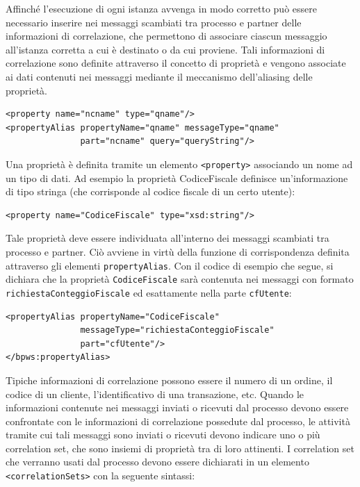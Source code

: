 Affinché l'esecuzione di ogni istanza avvenga in modo corretto può essere 
necessario inserire nei messaggi scambiati tra processo e partner delle
informazioni di correlazione, che permettono di associare ciascun messaggio 
all'istanza corretta a cui è destinato o da cui proviene. Tali informazioni di
correlazione sono definite attraverso il concetto di proprietà e vengono
associate ai dati contenuti nei messaggi mediante il meccanismo dell'aliasing
delle proprietà. 

\begin{verbatim}
<property name="ncname" type="qname"/>
<propertyAlias propertyName="qname" messageType="qname"
               part="ncname" query="queryString"/>

\end{verbatim}

Una proprietà è definita tramite un elemento \texttt{<property>} associando un
nome ad un tipo di dati. Ad esempio la proprietà CodiceFiscale definisce
un'informazione di tipo stringa (che corrisponde al codice fiscale di un
certo utente):

\begin{verbatim}
<property name="CodiceFiscale" type="xsd:string"/>
\end{verbatim}

Tale proprietà deve essere individuata all'interno dei messaggi scambiati tra
processo e partner. Ciò avviene in virtù della funzione di corrispondenza
definita attraverso gli elementi \texttt{propertyAlias}. Con il codice di
esempio che segue, si dichiara che la proprietà \texttt{CodiceFiscale} sarà
contenuta nei messaggi con formato \texttt{richiestaConteggioFiscale} ed
esattamente nella parte \texttt{cfUtente}:

\begin{verbatim}
<propertyAlias propertyName="CodiceFiscale"
               messageType="richiestaConteggioFiscale"
               part="cfUtente"/>
</bpws:propertyAlias>
\end{verbatim}

Tipiche informazioni di correlazione possono essere il numero di un ordine,
il codice di un cliente, l'identificativo di una transazione, etc.
Quando le informazioni contenute nei messaggi inviati o ricevuti dal processo 
devono essere confrontate con le informazioni di correlazione possedute dal
processo, le attività tramite cui tali messaggi sono inviati o ricevuti devono 
indicare uno o più correlation set, che sono insiemi di proprietà tra di loro
attinenti. I correlation set che verranno usati dal processo devono essere 
dichiarati in un elemento \texttt{<correlationSets>} con la seguente sintassi:

